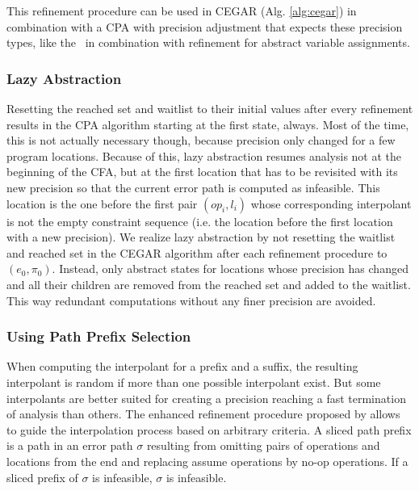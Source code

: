This refinement procedure can be used in CEGAR (Alg. \ref{alg:cegar}) in combination with a CPA with precision adjustment that expects these precision types, like the \ in combination with refinement for abstract variable assignments.

\subsubsection*{Lazy Abstraction}
Resetting the reached set and waitlist to their initial values after every refinement results in the CPA algorithm starting at the first state, always.
Most of the time, this is not actually necessary though, because precision only changed for a few program locations.
Because of this, lazy abstraction \cite{Henzinger2002} resumes analysis not at the beginning of the CFA, but at the first location that has to be revisited with its new precision so that the current error path is computed as infeasible.
This location is the one before the first pair $(op_i, l_i)$ whose corresponding interpolant is not the empty constraint sequence (i.e. the location before the first location with a new precision).
We realize lazy abstraction by not resetting the waitlist and reached set in the CEGAR algorithm after each refinement procedure to $(e_0, \pi_0)$.
Instead, only abstract states for locations whose precision has changed and all their children are removed from the reached set and added to the waitlist.
This way redundant computations without any finer precision are avoided.

\subsubsection*{Using Path Prefix Selection}
When computing the interpolant for a prefix and a suffix, the resulting interpolant is random if more than one possible interpolant exist. But some interpolants are better suited for creating a precision reaching a fast termination of analysis than others.
The enhanced refinement procedure proposed by \cite{Beyer2015} allows to guide the interpolation process based on arbitrary criteria.
A sliced path prefix is a path in an error path $\sigma$ resulting from omitting pairs of operations and locations from the end and replacing assume operations by no-op operations. If a sliced prefix of $\sigma$ is infeasible, $\sigma$ is infeasible.\cite{Beyer2015}

